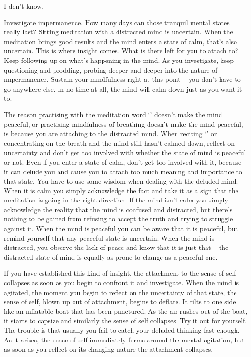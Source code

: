  I don't know.

 Investigate impermanence. How many days can those tranquil mental states really last? Sitting meditation with a distracted mind is uncertain. When the meditation brings good results and the mind enters a state of calm, that's also uncertain. This is where insight comes. What is there left for you to attach to? Keep following up on what's happening in the mind. As you investigate, keep questioning and prodding, probing deeper and deeper into the nature of impermanence. Sustain your mindfulness right at this point -- you don't have to go anywhere else. In no time at all, the mind will calm down just as you want it to. 

The reason practising with the meditation word `' doesn't make the mind peaceful, or practising mindfulness of breathing doesn't make the mind peaceful, is because you are attaching to the distracted mind. When reciting `' or concentrating on the breath and the mind still hasn't calmed down, reflect on uncertainty and don't get too involved with whether the state of mind is peaceful or not. Even if you enter a state of calm, don't get too involved with it, because it can delude you and cause you to attach too much meaning and importance to that state. You have to use some wisdom when dealing with the deluded mind. When it is calm you simply acknowledge the fact and take it as a sign that the meditation is going in the right direction. If the mind isn't calm you simply acknowledge the reality that the mind is confused and distracted, but there's nothing to be gained from refusing to accept the truth and trying to struggle against it. When the mind is peaceful you can be aware that it is peaceful, but remind yourself that any peaceful state is uncertain. When the mind is distracted, you observe the lack of peace and know that it is just that -- the distracted state of mind is equally as prone to change as a peaceful one. 

If you have established this kind of insight, the attachment to the sense of self collapses as soon as you begin to confront it and investigate. When the mind is agitated, the moment you begin to reflect on the uncertainty of that state, the sense of self, blown up out of attachment, begins to deflate. It tilts to one side like an inflatable boat that has been punctured. As the air rushes out of the boat, it starts to capsize and similarly the sense of self collapses. Try it out for yourself. The trouble is that usually you fail to catch your deluded thinking fast enough. As it arises, the sense of self immediately forms around the mental agitation, but as soon as you reflect on its changing nature the attachment collapses. 

